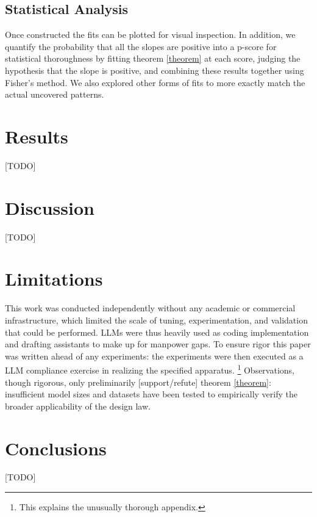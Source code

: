 \documentclass[11pt]{article}
\begin{document}
\subsection{Statistical Analysis}

Once constructed the fits can be plotted for visual inspection. In addition, we quantify the probability that all the slopes are positive into a p-score for statistical thoroughness by fitting theorem \ref{theorem} at each score, judging the hypothesis that the slope is positive, and combining these results together using Fisher's method. We also explored other forms of fits to more exactly match the actual uncovered patterns.

\section{Results}
\label{sec:results}

[TODO]

\section{Discussion}
\label{sec:discussion}

[TODO]

\section{Limitations}

This work was conducted independently without any academic or commercial infrastructure, which limited the scale of tuning, experimentation, and validation that could be performed. LLMs were thus heavily used as coding implementation and drafting assistants to make up for manpower gaps. To ensure rigor this paper was written ahead of any experiments: the experiments were then executed as a LLM compliance exercise in realizing the specified apparatus. \footnote{This explains the unusually thorough appendix.} Observations, though rigorous, only preliminarily [support/refute] theorem \ref{theorem}: insufficient model sizes and datasets have been tested to empirically verify the broader applicability of the design law.

\section{Conclusions}

[TODO]



\end{document}
